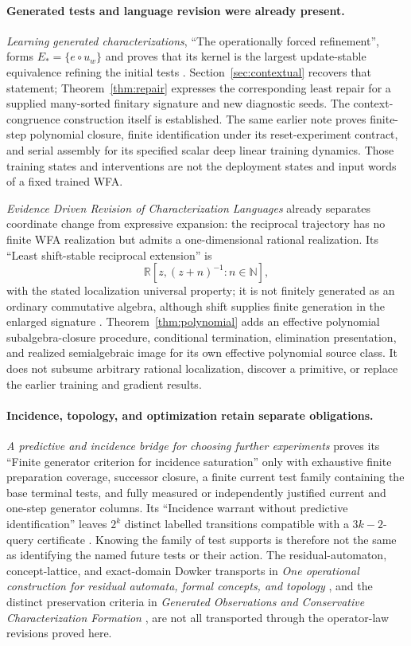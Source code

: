\documentclass[11pt]{article}
\theoremstyle{definition}
\theoremstyle{remark}\newtheorem{remark}[theorem]{Remark}
\begin{document}
\paragraph{Generated tests and language revision were already present.}
\emph{Learning generated characterizations}, ``The operationally forced
refinement'', forms $E_* =\{e\circ u_w\}$ and proves that its kernel is
the largest update-stable equivalence refining the initial tests
\cite{learning-note}. Section~\ref{sec:contextual} recovers that statement;
Theorem~\ref{thm:repair} expresses the corresponding least repair for a
supplied many-sorted finitary signature and new diagnostic seeds. The
context-congruence construction itself is established. The same earlier
note proves finite-step polynomial closure, finite identification under
its reset-experiment contract, and serial assembly for its specified
scalar deep linear training dynamics. Those training states and interventions
are not the deployment states and input words of a fixed trained WFA.

\emph{Evidence Driven Revision of Characterization Languages} already
separates coordinate change from expressive expansion: the reciprocal
trajectory has no finite WFA realization but admits a one-dimensional
rational realization. Its ``Least shift-stable reciprocal extension'' is
\[
 \mathbb R[z,(z+n)^{-1}:n\in\mathbb N],
\]
with the stated localization universal property; it is not finitely
generated as an ordinary commutative algebra, although shift supplies
finite generation in the enlarged signature \cite{characterization-note}.
Theorem~\ref{thm:polynomial} adds an effective polynomial subalgebra-closure
procedure, conditional termination, elimination presentation, and realized
semialgebraic image for its own effective polynomial source class. It does
not subsume arbitrary rational localization, discover a primitive, or
replace the earlier training and gradient results.

\paragraph{Incidence, topology, and optimization retain separate obligations.}
\emph{A predictive and incidence bridge for choosing further experiments}
proves its ``Finite generator criterion for incidence saturation'' only
with exhaustive finite preparation coverage, successor closure, a finite
current test family containing the base terminal tests, and fully measured
or independently justified current and one-step generator columns. Its ``Incidence
warrant without predictive identification'' leaves $2^k$ distinct labelled
transitions compatible with a $3k-2$-query certificate
\cite{predictive-note}. Knowing the family of test supports is therefore
not the same as identifying the named future tests or their action.
The residual-automaton, concept-lattice, and exact-domain Dowker transports
in \emph{One operational construction for residual automata, formal
concepts, and topology} \cite{common-note}, and the distinct preservation
criteria in \emph{Generated Observations and Conservative Characterization
Formation} \cite{generated-note}, are not all transported through the
operator-law revisions proved here.
\end{document}
